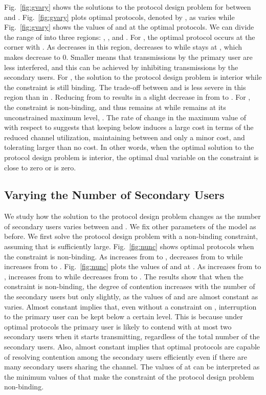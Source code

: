 \documentclass[12pt,draftclsnofoot,onecolumn]{IEEEtran}
\begin{document}
Fig.~\ref{fig:gvary} shows the solutions to the protocol design problem
for  between  and . Fig.~\ref{fig:gvary}
plots optimal protocols, denoted by , as  varies while
Fig.~\ref{fig:gvary} shows the values of  and 
at the optimal protocols. We can divide the range of  into three regions:
, , and .
For , the optimal protocol occurs at the corner with . As  decreases
in this region,  decreases to  while  stays at , which makes  decrease to 0.
Smaller  means that transmissions by the primary user are less interfered, and this can be achieved
by inhibiting transmissions by the secondary users. For , the solution to
the protocol design problem is interior while the constraint  is still
binding. The trade-off between  and  is less severe in this region
than in . Reducing  from  to  results in a slight decrease in 
from  to . For , the constraint
 is non-binding, and thus  remains at 
while  remains at its unconstrained maximum level, .
The rate of change in the maximum value of  with respect to  suggests that
keeping  below  induces a large cost in terms of the reduced channel utilization,
maintaining  between  and  only a minor cost,
and tolerating  larger than  no cost.
In other words, when the optimal solution to the protocol design
problem is interior, the optimal dual variable on the constraint  is close
to zero or is zero.

\subsection{Varying the Number of Secondary Users}

We study how the solution to the protocol design problem changes as the number of
secondary users varies between  and . We fix other parameters of the model as before. We first solve the
protocol design problem with a non-binding constraint, assuming that  is sufficiently large.
Fig.~\ref{fig:nunc} shows optimal
protocols  when the constraint is non-binding. As  increases from  to ,  decreases
from  to  while  increases from  to .
Fig.~\ref{fig:nunc} plots the values of  and 
at . As  increases from  to ,
 increases from  to  while
 decreases from  to .
The results show that when the constraint is non-binding,
the degree of contention increases with the number of the secondary users
but only slightly, as the values of  and  are almost constant as  varies.
Almost constant  implies that, even without a constraint on , interruption to the primary user
can be kept below a certain level.
This is because under optimal protocols the primary user is likely to contend with
at most two secondary users when it starts transmitting, regardless of the total number
of the secondary users.
Also, almost constant  implies that optimal protocols are capable of resolving contention among
the secondary users efficiently even if there are many secondary users sharing the channel.
The values of  at 
can be interpreted as the minimum values of  that make the constraint of
the protocol design problem non-binding.
\end{document}

